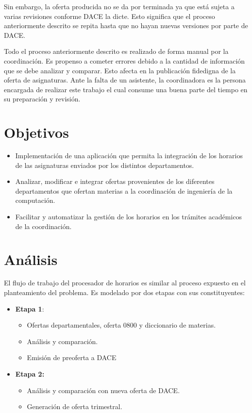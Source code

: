 \documentclass[]{article}
\begin{document}
Sin embargo, la oferta producida no se da por terminada ya que está
sujeta a varias revisiones conforme DACE la dicte. Esto significa que el
proceso anteriormente descrito se repita hasta que no hayan nuevas
versiones por parte de DACE.

Todo el proceso anteriormente descrito es realizado de forma manual por
la coordinación. Es propenso a cometer errores debido a la cantidad de
información que se debe analizar y comparar. Esto afecta en la
publicación fidedigna de la oferta de asignaturas. Ante la falta de un
asistente, la coordinadora es la persona encargada de realizar este
trabajo el cual consume una buena parte del tiempo en su preparación y
revisión.

\section{Objetivos}\label{objetivos}

\begin{itemize}
\item
  Implementación de una aplicación que permita la integración de los
  horarios de las asignaturas enviados por los distintos departamentos.
\item
  Analizar, modificar e integrar ofertas provenientes de los diferentes
  departamentos que ofertan materias a la coordinación de ingeniería de
  la computación.
\item
  Facilitar y automatizar la gestión de los horarios en los trámites
  académicos de la coordinación.
\end{itemize}

\section{Análisis}\label{anuxe1lisis}

El flujo de trabajo del procesador de horarios es similar al proceso
expuesto en el planteamiento del problema. Es modelado por dos etapas
con sus constituyentes:

\begin{itemize}
\itemsep1pt\parskip0pt
\item
  \textbf{Etapa 1}:

  \begin{itemize}
  \itemsep1pt\parskip0pt
  \item
    Ofertas departamentales, oferta 0800 y diccionario de materias.
  \item
    Análisis y comparación.
  \item
    Emisión de preoferta a DACE
  \end{itemize}
\item
  \textbf{Etapa 2:}

  \begin{itemize}
  \itemsep1pt\parskip0pt
  \item
    Análisis y comparación con nueva oferta de DACE.
  \item
    Generación de oferta trimestral.
  \end{itemize}
\end{itemize}
\end{document}
